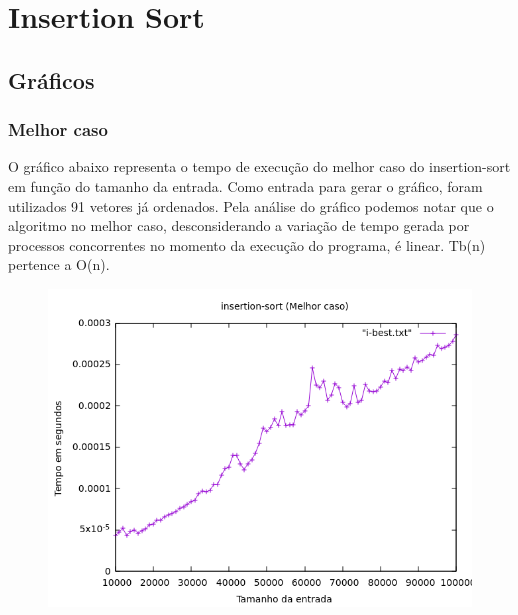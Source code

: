 \chapter{Insertion Sort}

\section{Gráficos}
\subsection{Melhor caso}
O gráfico abaixo representa o tempo de execução do melhor caso do insertion-sort em função do tamanho da entrada. Como entrada para gerar o gráfico, foram utilizados 91 vetores já ordenados. Pela análise do gráfico podemos notar que o algoritmo no melhor caso, desconsiderando a variação de tempo gerada por processos concorrentes no momento da execução do programa, é linear. Tb(n) pertence a O(n).
\begin{figure}[h]
    \centering
    \includegraphics[width=1\linewidth]{Imagens/i-best.png}
\end{figure}

\newpage


